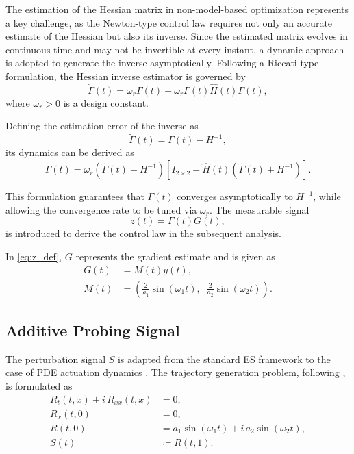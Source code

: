 \documentclass[letterpaper, 10 pt, conference]{ieeeconf}  %
\begin{document}
The estimation of the Hessian matrix in non-model-based optimization represents a key challenge, as the Newton-type control law requires not only an accurate estimate of the Hessian but also its inverse. Since the estimated matrix evolves in continuous time and may not be invertible at every instant, a dynamic approach is adopted to generate the inverse asymptotically. Following a Riccati-type formulation, the Hessian inverse estimator is governed by
\begin{equation}
\dot{\Gamma}(t) = \omega_r \Gamma(t) - \omega_r \Gamma(t) \hat{H}(t) \Gamma(t),
\label{eq:gamma_dot}
\end{equation}
where $\omega_r > 0$ is a design constant. 

Defining the estimation error of the inverse as 
\begin{equation}
\tilde{\Gamma}(t) = \Gamma(t) - H^{-1},
\label{eq:gamma_tilde}
\end{equation}
its dynamics can be derived as
\begin{equation}
    \dot{\tilde{\Gamma}}(t) = \omega_r (\tilde{\Gamma}(t) + H^{-1})[I_{2\times 2} - \hat{H}(t)(\tilde{\Gamma}(t) + H^{-1})].
    \label{eq:gamma_tilde_dot}
\end{equation}

This formulation guarantees that $\Gamma(t)$ converges asymptotically to $H^{-1}$, while allowing the convergence rate to be tuned via $\omega_r$. The measurable signal
\begin{equation}
z(t) = \Gamma(t) G(t),
\label{eq:z_def}
\end{equation}
is introduced to derive the control law in the subsequent analysis.

In \eqref{eq:z_def}, $G$ represents the gradient estimate and is given as \cite{book2022}
\begin{align}
    G(t) &= M(t)y(t),\nonumber\\
    M(t) &= \left(\frac{2}{a_{1}}\sin(\omega_{1} t),\;\; \frac{2}{a_{2}}\sin(\omega_{2} t) \right). \label{eq:gradient_estimate}
\end{align}

   
\subsection{Additive Probing Signal}
The perturbation signal $S$ is adapted from the standard ES framework to the case of PDE actuation dynamics \cite{Oliveira2017ExtremumSF,book2022}. The trajectory generation problem, following \cite{Krsti2008BoundaryCO}, is formulated as
\begin{align}
    R_{t}(t,x) + i\,R_{xx}(t,x) &= 0, \label{eq:trajectoryPDE}\\
    R_{x}(t,0) &= 0, \label{eq:trajectorybc0}\\
    R(t,0) &= a_{1}\sin(\omega_{1} t) +i\,a_{2}\sin(\omega_{2} t), \label{eq:trajectorybc03}\\
    S(t) &\coloneqq R(t,1). \label{eq:perturbation}
\end{align}
\end{document}
